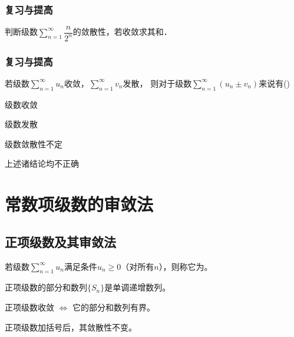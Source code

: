 \documentclass[14pt,notheorems,leqno,xcolor={rgb}]{beamer} %
\begin{document}

\begin{frame}
\frametitle{复习与提高}
\begin{puzzle}
判断级数$\sum\limits_{n=1}^{\infty}\dfrac{n}{2^n}$的敛散性，若收敛求其和．
\end{puzzle}
\end{frame}

\begin{frame}
\frametitle{复习与提高}
\begin{choice}
若级数$\sum\limits_{n=1}^{\infty}u_n$收敛，$\sum\limits_{n=1}^{\infty}v_n$发散，\vspace{-0.5em}%
则对于级数$\sum\limits_{n=1}^{\infty}(u_n\pm v_n)$来说有\dotfill()
\begin{choicehalf}
  \item 级数收敛 ~
  \item 级数发散 ~
  \item 级数敛散性不定 ~
  \item 上述诸结论均不正确 ~
\end{choicehalf}
\end{choice}
\end{frame}

\section{常数项级数的审敛法}

\subsection{正项级数及其审敛法}

\begin{frame}
\begin{definition}
若级数$\sum\limits_{n=1}^{\infty}u_n$满足条件$u_n\ge0$（对所有$n$），则称它为。
\end{definition}
\vpause
\begin{property*}
正项级数的部分和数列$\{S_n\}$是单调递增数列。
\end{property*}
\vpause
\begin{theorem}
正项级数收敛 $\Longleftrightarrow$ 它的部分和数列有界。
\end{theorem}
\vpause
\begin{remark*}
正项级数加括号后，其敛散性不变。
\end{remark*}
\end{frame}
\end{document}
